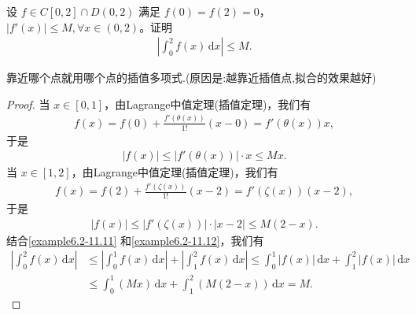\documentclass[../../main.tex]{subfiles}
\begin{document}
\begin{example}
设 $f \in C[0,2] \cap D(0,2)$ 满足 $f(0) = f(2) = 0$，$|f'(x)| \leqslant  M, \forall x \in (0,2)$。证明
\begin{align*}
\left| \int_{0}^{2} f(x) \, \mathrm{d}x \right| \leqslant  M.
\end{align*}
\end{example}
\begin{note}
靠近哪个点就用哪个点的插值多项式.(原因是:越靠近插值点,拟合的效果越好)
\end{note}
\begin{proof}
当 $x \in [0,1]$，由Lagrange中值定理(插值定理)，我们有
\begin{align*}
f(x) = f(0) + \frac{f'(\theta(x))}{1!} (x - 0) = f'(\theta(x)) x,
\end{align*}
于是
\begin{align}
|f(x)| \leqslant  |f'(\theta(x))| \cdot x \leqslant  Mx.\label{example6.2-11.11}
\end{align}
当 $x \in [1,2]$，由Lagrange中值定理(插值定理)，我们有
\begin{align*}
f(x) = f(2) + \frac{f'(\zeta(x))}{1!} (x - 2) = f'(\zeta(x)) (x - 2),
\end{align*}
于是
\begin{align}
|f(x)| \leqslant  |f'(\zeta(x))| \cdot |x - 2| \leqslant  M(2 - x).\label{example6.2-11.12}
\end{align}
结合\eqref{example6.2-11.11} 和\eqref{example6.2-11.12}，我们有
\begin{align*}
\left| \int_{0}^{2} f(x) \, \mathrm{d}x \right| &\leqslant  \left| \int_{0}^{1} f(x) \, \mathrm{d}x \right| + \left| \int_{1}^{2} f(x) \, \mathrm{d}x \right| 
\leqslant  \int_{0}^{1} |f(x)| \, \mathrm{d}x + \int_{1}^{2} |f(x)| \, \mathrm{d}x \\
&\leqslant  \int_{0}^{1} (Mx) \, \mathrm{d}x + \int_{1}^{2} (M(2 - x)) \, \mathrm{d}x 
= M.
\end{align*}
\end{proof}
\end{document}
